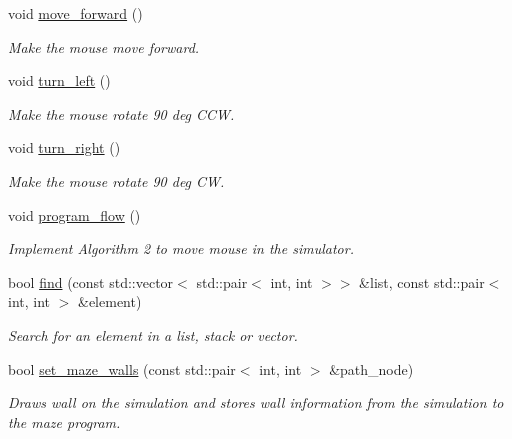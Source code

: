 \begin{DoxyCompactItemize}
void \hyperlink{classrwa2_1_1_mouse_afc6e0d56e3a777c05efa3929eb256e0a}{move\+\_\+forward} ()
\begin{DoxyCompactList}\small\item\em Make the mouse move forward. \end{DoxyCompactList}\item 
\mbox{\label{classrwa2_1_1_mouse_a5748e94e740432c334d15364fb476919}} 
void \hyperlink{classrwa2_1_1_mouse_a5748e94e740432c334d15364fb476919}{turn\+\_\+left} ()
\begin{DoxyCompactList}\small\item\em Make the mouse rotate 90 deg C\+CW. \end{DoxyCompactList}\item 
\mbox{\label{classrwa2_1_1_mouse_ac929127d86fc4a41d1e216968b1dae20}} 
void \hyperlink{classrwa2_1_1_mouse_ac929127d86fc4a41d1e216968b1dae20}{turn\+\_\+right} ()
\begin{DoxyCompactList}\small\item\em Make the mouse rotate 90 deg CW. \end{DoxyCompactList}\item 
\mbox{\label{classrwa2_1_1_mouse_a7ca431550bf9f8b27f904b20f77519f4}} 
void \hyperlink{classrwa2_1_1_mouse_a7ca431550bf9f8b27f904b20f77519f4}{program\+\_\+flow} ()
\begin{DoxyCompactList}\small\item\em Implement Algorithm 2 to move mouse in the simulator. \end{DoxyCompactList}\item 
bool \hyperlink{classrwa2_1_1_mouse_a5de2232aada66b8fa3a640fcb0554761}{find} (const std\+::vector$<$ std\+::pair$<$ int, int $>$$>$ \&list, const std\+::pair$<$ int, int $>$ \&element)
\begin{DoxyCompactList}\small\item\em Search for an element in a list, stack or vector. \end{DoxyCompactList}\item 
bool \hyperlink{classrwa2_1_1_mouse_aba15def87bc971a1b4f02252ab53c600}{set\+\_\+maze\+\_\+walls} (const std\+::pair$<$ int, int $>$ \&path\+\_\+node)
\begin{DoxyCompactList}\small\item\em Draws wall on the simulation and stores wall information from the simulation to the maze program. \end{DoxyCompactList}\item 
$$
\end{DoxyCompactItemize}

